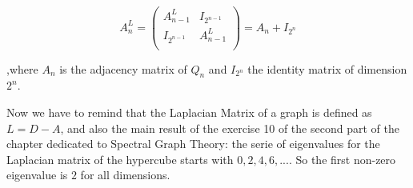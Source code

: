 \documentclass{article}
\begin{document}
$$
A^{L}_{n} = 
    \begin{pmatrix}
    A^{L}_{n-1} & I_{2^{n-1}}\\
    I_{2^{n-1}} & A^{L}_{n-1}\\
    \end{pmatrix}
    = A_{n} + I_{2^n}
$$ 

\noindent ,where $A_{n}$ is the adjacency matrix of $Q_n$ and $I_{2^{n}}$ the identity matrix of dimension $2^n$.


\noindent Now we have to remind that the Laplacian Matrix of a graph is defined as $L = D - A$, and also the main result of the exercise 10 of the second part of the chapter dedicated to Spectral Graph Theory: the serie of eigenvalues for the Laplacian matrix of the hypercube starts with $0, 2, 4, 6, ...$. So the first non-zero eigenvalue is $2$ for all dimensions.
\end{document}

